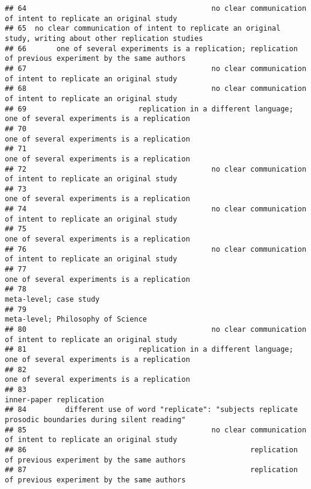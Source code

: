 \documentclass[
  english,
  man]{apa6}
\begin{document}
\begin{verbatim}
## 64                                           no clear communication of intent to replicate an original study
## 65  no clear communication of intent to replicate an original study, writing about other replication studies
## 66       one of several experiments is a replication; replication of previous experiment by the same authors
## 67                                           no clear communication of intent to replicate an original study
## 68                                           no clear communication of intent to replicate an original study
## 69                          replication in a different language; one of several experiments is a replication
## 70                                                               one of several experiments is a replication
## 71                                                               one of several experiments is a replication
## 72                                           no clear communication of intent to replicate an original study
## 73                                                               one of several experiments is a replication
## 74                                           no clear communication of intent to replicate an original study
## 75                                                               one of several experiments is a replication
## 76                                           no clear communication of intent to replicate an original study
## 77                                                               one of several experiments is a replication
## 78                                                                                    meta-level; case study
## 79                                                                         meta-level; Philosophy of Science
## 80                                           no clear communication of intent to replicate an original study
## 81                          replication in a different language; one of several experiments is a replication
## 82                                                               one of several experiments is a replication
## 83                                                                                   inner-paper replication
## 84         different use of word "replicate": "subjects replicate prosodic boundaries during silent reading"
## 85                                           no clear communication of intent to replicate an original study
## 86                                                    replication of previous experiment by the same authors
## 87                                                    replication of previous experiment by the same authors

\end{verbatim}
\end{document}
